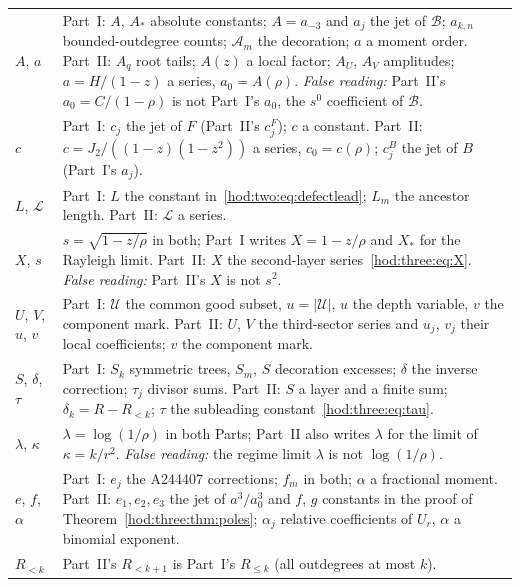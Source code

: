 \documentclass[11pt,letterpaper]{article}
\theoremstyle{definition}\newtheorem{definition}[theorem]{Definition}
\theoremstyle{remark}\newtheorem{remark}[theorem]{Remark}
\newcommand{\Bcal}{\mathcal B}
\newcommand{\Lcal}{\mathcal L}
\begin{document}
\begin{longtable}{@{}>{\raggedright\arraybackslash}p{0.75in}>{\raggedright\arraybackslash}p{5.45in}@{}}
$A$, $a$ & Part~I: $A$, $A_*$ absolute constants; $A=a_{-3}$ and $a_j$ the jet of $\Bcal$; $a_{k,n}$ bounded-outdegree counts; $\mathcal A_m$ the decoration; $a$ a moment order. Part~II: $A_q$ root tails; $A(z)$ a local factor; $A_U$, $A_V$ amplitudes; $a=H/(1-z)$ a series, $a_0=A(\rho)$. \emph{False reading:} Part~II's $a_0=C/(1-\rho)$ is not Part~I's $a_0$, the $s^0$ coefficient of $\Bcal$.\\
$c$ & Part~I: $c_j$ the jet of $F$ (Part~II's $c^F_j$); $c$ a constant. Part~II: $c=J_2/((1-z)(1-z^2))$ a series, $c_0=c(\rho)$; $c^B_j$ the jet of $B$ (Part~I's $a_j$).\\
$L$, $\Lcal$ & Part~I: $L$ the constant in~\eqref{hod:two:eq:defectlead}; $L_m$ the ancestor length. Part~II: $\Lcal$ a series.\\
$X$, $s$ & $s=\sqrt{1-z/\rho}$ in both; Part~I writes $X=1-z/\rho$ and $X_*$ for the Rayleigh limit. Part~II: $X$ the second-layer series~\eqref{hod:three:eq:X}. \emph{False reading:} Part~II's $X$ is not $s^2$.\\
$U$, $V$, $u$, $v$ & Part~I: $\mathcal U$ the common good subset, $u=|\mathcal U|$, $u$ the depth variable, $v$ the component mark. Part~II: $U$, $V$ the third-sector series and $u_j$, $v_j$ their local coefficients; $v$ the component mark.\\
$S$, $\delta$, $\tau$ & Part~I: $S_k$ symmetric trees, $S_m$, $S$ decoration excesses; $\delta$ the inverse correction; $\tau_j$ divisor sums. Part~II: $S$ a layer and a finite sum; $\delta_k=R-R_{<k}$; $\tau$ the subleading constant~\eqref{hod:three:eq:tau}.\\
$\lambda$, $\kappa$ & $\lambda=\log(1/\rho)$ in both Parts; Part~II also writes $\lambda$ for the limit of $\kappa=k/r^2$. \emph{False reading:} the regime limit $\lambda$ is not $\log(1/\rho)$.\\
$e$, $f$, $\alpha$ & Part~I: $e_j$ the A244407 corrections; $f_m$ in both; $\alpha$ a fractional moment. Part~II: $e_1,e_2,e_3$ the jet of $a^3/a_0^3$ and $f$, $g$ constants in the proof of Theorem~\ref{hod:three:thm:poles}; $\alpha_j$ relative coefficients of $U_r$, $\alpha$ a binomial exponent.\\
$R_{<k}$ & Part~II's $R_{<k+1}$ is Part~I's $R_{\le k}$ (all outdegrees at most $k$).\\
\bottomrule
\end{longtable}\addtocounter{table}{-1}%
\endgroup
\end{document}
